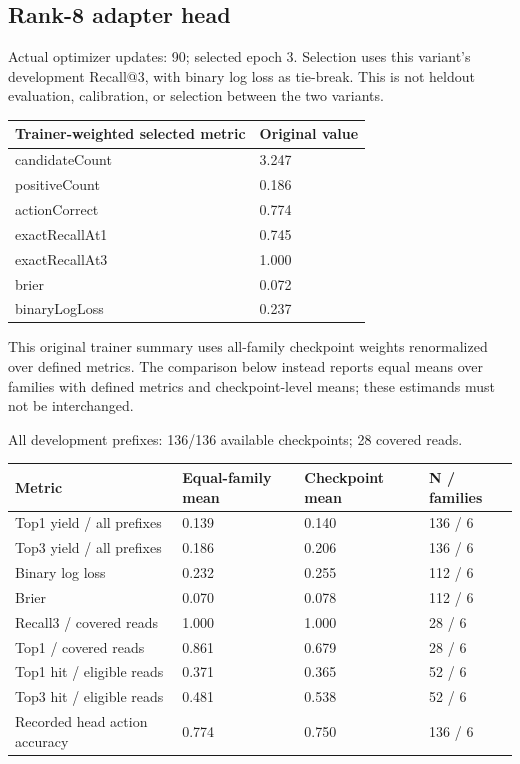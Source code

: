 \documentclass[10pt]{article}
\begin{document}
\hypertarget{rank-8-adapter-head}{%
\subsection{Rank-8 adapter head}\label{rank-8-adapter-head}}

Actual optimizer updates: 90; selected epoch 3. Selection uses this variant's development Recall@3, with binary log loss as tie-break. This is not heldout evaluation, calibration, or selection between the two variants.

\begin{longtable}[]{@{}ll@{}}
\toprule\noalign{}
Trainer-weighted selected metric & Original value \\
\midrule\noalign{}
\endhead
\bottomrule\noalign{}
\endlastfoot
candidateCount & 3.247 \\
positiveCount & 0.186 \\
actionCorrect & 0.774 \\
exactRecallAt1 & 0.745 \\
exactRecallAt3 & 1.000 \\
brier & 0.072 \\
binaryLogLoss & 0.237 \\
\end{longtable}

This original trainer summary uses all-family checkpoint weights renormalized over defined metrics. The comparison below instead reports equal means over families with defined metrics and checkpoint-level means; these estimands must not be interchanged.

All development prefixes: 136/136 available checkpoints; 28 covered reads.

\begin{longtable}[]{@{}llll@{}}
\toprule\noalign{}
Metric & Equal-family mean & Checkpoint mean & N / families \\
\midrule\noalign{}
\endhead
\bottomrule\noalign{}
\endlastfoot
Top1 yield / all prefixes & 0.139 & 0.140 & 136 / 6 \\
Top3 yield / all prefixes & 0.186 & 0.206 & 136 / 6 \\
Binary log loss & 0.232 & 0.255 & 112 / 6 \\
Brier & 0.070 & 0.078 & 112 / 6 \\
Recall3 / covered reads & 1.000 & 1.000 & 28 / 6 \\
Top1 / covered reads & 0.861 & 0.679 & 28 / 6 \\
Top1 hit / eligible reads & 0.371 & 0.365 & 52 / 6 \\
Top3 hit / eligible reads & 0.481 & 0.538 & 52 / 6 \\
Recorded head action accuracy & 0.774 & 0.750 & 136 / 6 \\
\end{longtable}
\end{document}
